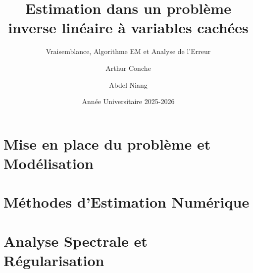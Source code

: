 

\title{Estimation dans un problème inverse linéaire à variables cachées}
\subtitle{Vraisemblance, Algorithme EM et Analyse de l'Erreur}
\author{Arthur Conche \and Abdel Niang}
\date{Année Universitaire 2025-2026}





\section{Mise en place du problème et Modélisation}




\section{Méthodes d'Estimation Numérique}




\section{Analyse Spectrale et Régularisation}







